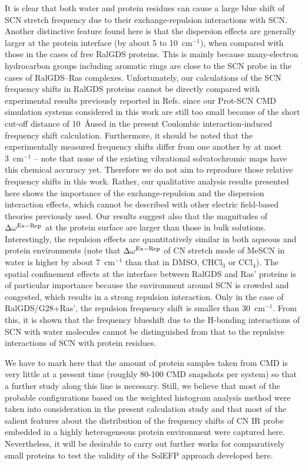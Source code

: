 \documentclass[b5paper,oneside,fleqn,11pt]{book}
\begin{document}
\begin{refsection}
It is clear that both water and protein residues can cause
a large blue shift of SCN stretch frequency due to their
exchange\hyp{}repulsion interactions with SCN. Another distinctive
feature found here is that the dispersion effects are generally
larger at the protein interface (by about 5 to 10~cm$^{-1}$), when
compared with those in the cases of free RalGDS proteins. This
is mainly because many\hyp{}electron hydrocarbon groups including
aromatic rings are close to the SCN probe in the cases of
RalGDS--Ras complexes. Unfortunately, our calculations of the
SCN frequency shifts in RalGDS proteins cannot be directly
compared with experimental results previously reported in
Refs. \citep{Stafford.Ensign.Webb.JPCB.2010,Ritchie.Webb.JPCB.2013,Ritchie.Webb.JPCB.2015} 
since our Prot-SCN CMD simulation systems considered in
this work are still too small because of the short cut\hyp{}off
distance of 10~\AA used in the present Coulombic interaction\hyp{}induced
frequency shift calculation. Furthermore, it should be noted
that the experimentally measured frequency shifts differ from
one another by at most 3~cm$^{-1}$ -- note that none of the existing
vibrational solvatochromic maps have this chemical accuracy
yet. Therefore we do not aim to reproduce those relative
frequency shifts in this work. Rather, our qualitative analysis
results presented here shows the importance of the exchange-repulsion
and the dispersion interaction effects, which cannot
be described with other electric field\hyp{}based theories previously
used. Our results suggest also that the magnitudes of
$\Delta\omega^{\rm Ex-Rep}$ at the protein surface are larger than those in bulk
solutions. Interestingly, the repulsion effects are quantitatively
similar in both aqueous and protein environments (note that
$\Delta\omega^{\rm Ex-Rep}$ of CN stretch mode of MeSCN in water is higher by
about 7~cm$^{-1}$ than that in DMSO, CHCl$_3$ or CCl$_4$). The spatial
confinement effects at the interface between RalGDS and Ras'
proteins is of particular importance because the environment
around SCN is crowded and congested, which results in a
strong repulsion interaction. Only in the case of
RalGDS/G28+Ras', the repulsion frequency shift is smaller
than 30~cm$^{-1}$. From this, it is shown that the frequency blueshift
due to the H-bonding interactions of SCN with water
molecules cannot be distinguished from that to the repulsive
interactions of SCN with protein residues.

We have to mark here that the amount of protein samples
taken from CMD is very little at a present time (roughly 80-100
CMD snapshots per system) so that a further study along this
line is necessary. Still, we believe that most of the probable
configurations based on the weighted histogram analysis
method were taken into consideration in the present
calculation study and that most of the salient features about
the distribution of the frequency shifts of CN IR probe
embedded in a highly heterogeneous protein environment
were captured here. Nevertheless, it will be desirable to carry
out further works for comparatively small proteins to test the
validity of the SolEFP approach developed here.




\end{refsection}
\end{document}
